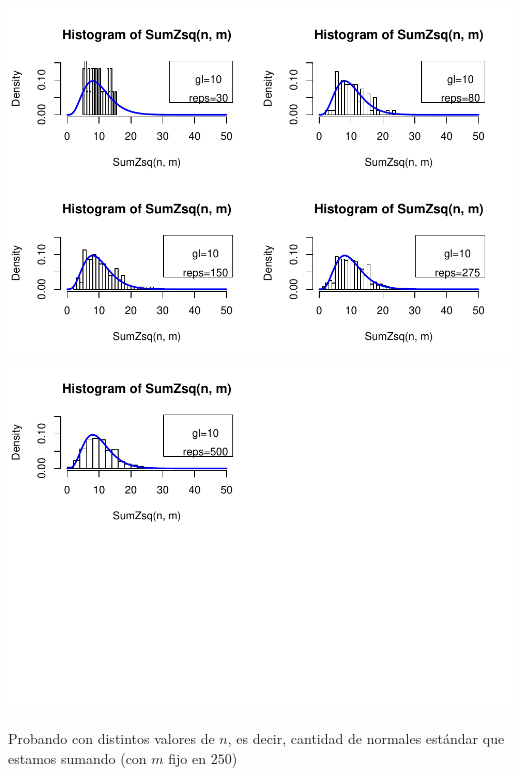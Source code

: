 \documentclass[]{article}
\begin{document}
\includegraphics{NotaDeClaseLong_files/figure-latex/unnamed-chunk-12-1.pdf}
\includegraphics{NotaDeClaseLong_files/figure-latex/unnamed-chunk-12-2.pdf}

Probando con distintos valores de \(n\), es decir, cantidad de normales
estándar que estamos sumando (con \(m\) fijo en \(250\))
\end{document}
